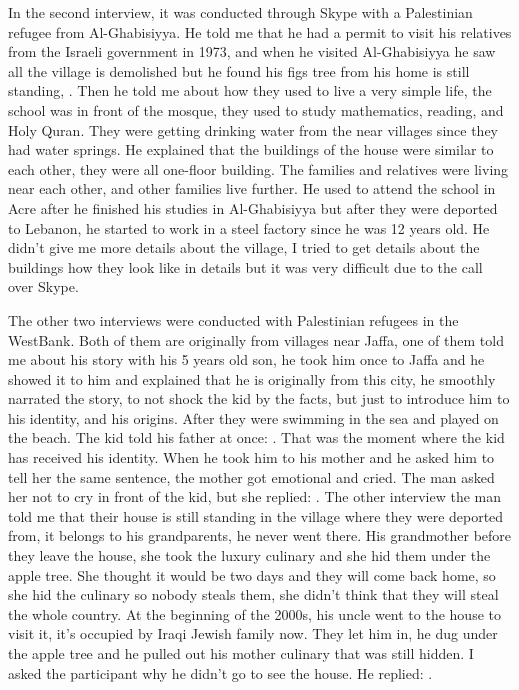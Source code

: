 In the second interview, it was conducted through Skype with a Palestinian refugee from Al-Ghabisiyya. He told me that he had a permit to visit his relatives from the Israeli government in 1973, and when he visited Al-Ghabisiyya he saw all the village is demolished but he found his figs tree from his home is still standing, . Then he told me about how they used to live a very simple life, the school was in front of the mosque, they used to study mathematics, reading, and Holy Quran. They were getting drinking water from the near villages since they had water springs. He explained that the buildings of the house were similar to each other, they were all one-floor building. The families and relatives were living near each other, and other families live further. He used to attend the school in Acre after he finished his studies in Al-Ghabisiyya but after they were deported to Lebanon,  he started to work in a steel factory since he was 12 years old. He didn't give me more details about the village, I tried to get details about the buildings how they look like in details but it was very difficult due to the call over Skype. 


The other two interviews were conducted with Palestinian refugees in the WestBank. Both of them are originally from villages near Jaffa, one of them told me about his story with his 5 years old son, he took him once to Jaffa and he showed it to him and explained that he is originally from this city, he smoothly narrated the story, to not shock the kid by the facts, but just to introduce him to his identity, and his origins. After they were swimming in the sea and played on the beach. The kid told his father at once: . That was the moment where the kid has received his identity.  When he took him to his mother and he asked him to tell her the same sentence, the mother got emotional and cried. The man asked her not to cry in front of the kid, but she replied: . The other interview the man told me that their house is still standing in the village where they were deported from, it belongs to his grandparents, he never went there. His grandmother before they leave the house, she took the luxury culinary and she hid them under the apple tree. She thought it would be two days and they will come back home, so she hid the culinary so nobody steals them, she didn't think that they will steal the whole country. At the beginning of the 2000s, his uncle went to the house to visit it, it's occupied by Iraqi Jewish family now. They let him in, he dug under the apple tree and he pulled out his mother culinary that was still hidden. I asked the participant why he didn't go to see the house. He replied: .  

